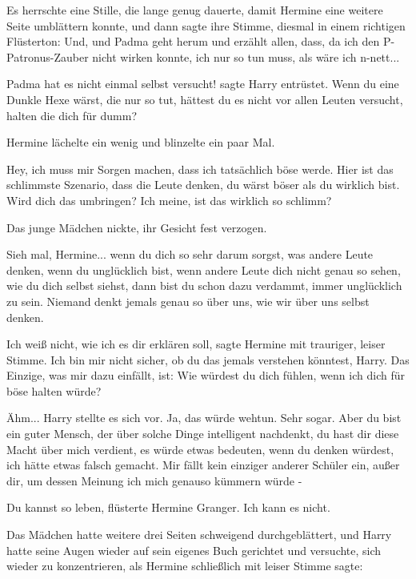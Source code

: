 Es herrschte eine Stille, die lange genug dauerte, damit Hermine eine weitere
Seite umblättern konnte, und dann sagte ihre Stimme, diesmal in einem richtigen
Flüsterton: \glqq{}Und, und Padma geht herum und erzählt allen, dass, da ich den
P-Patronus-Zauber nicht wirken konnte, ich nur so tun muss, als wäre ich
n-nett...\grqq{}

\glqq{}Padma hat es nicht einmal selbst versucht!\grqq{} sagte Harry entrüstet.
\glqq{}Wenn du eine Dunkle Hexe wärst, die nur so tut, hättest du es nicht vor
allen Leuten versucht, halten die dich für dumm?\grqq{}

Hermine lächelte ein wenig und blinzelte ein paar Mal.

\glqq{}Hey, ich muss mir Sorgen machen, dass ich tatsächlich böse werde. Hier ist
das schlimmste Szenario, dass die Leute denken, du wärst böser als du wirklich
bist. Wird dich das umbringen? Ich meine, ist das wirklich so schlimm?\grqq{}

Das junge Mädchen nickte, ihr Gesicht fest verzogen.

\glqq{}Sieh mal, Hermine... wenn du dich so sehr darum sorgst, was andere Leute
denken, wenn du unglücklich bist, wenn andere Leute dich nicht genau so sehen,
wie du dich selbst siehst, dann bist du schon dazu verdammt, immer unglücklich
zu sein. Niemand denkt jemals genau so über uns, wie wir über uns selbst
denken.\grqq{}

\glqq{}Ich weiß nicht, wie ich es dir erklären soll\grqq{}, sagte Hermine mit
trauriger, leiser Stimme. \glqq{}Ich bin mir nicht sicher, ob du das jemals
verstehen könntest, Harry. Das Einzige, was mir dazu einfällt, ist: Wie würdest
du dich fühlen, wenn ich dich für böse halten würde?\grqq{}

\glqq{}Ähm...\grqq{} Harry stellte es sich vor. \glqq{}Ja, das würde wehtun. Sehr
sogar. Aber du bist ein guter Mensch, der über solche Dinge intelligent
nachdenkt, du hast dir diese Macht über mich verdient, es würde etwas bedeuten,
wenn du denken würdest, ich hätte etwas falsch gemacht. Mir fällt kein einziger
anderer Schüler ein, außer dir, um dessen Meinung ich mich genauso kümmern würde
-\grqq{}

\glqq{}Du kannst so leben\grqq{}, flüsterte Hermine Granger. \glqq{}Ich kann es
nicht.\grqq{}

Das Mädchen hatte weitere drei Seiten schweigend durchgeblättert, und Harry
hatte seine Augen wieder auf sein eigenes Buch gerichtet und versuchte, sich
wieder zu konzentrieren, als Hermine schließlich mit leiser Stimme sagte:

